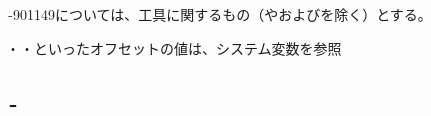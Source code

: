 \clearpage
\,-\ttNum901149については、工具に関するもの（\ToolLength や\ToolDiameter および\ToolWear を除く）とする。
\begin{hosoku}
\ToolLength・\ToolDiameter・\ToolWear といったオフセットの値は、システム変数を参照
\end{hosoku}

\subsection{\,-}

